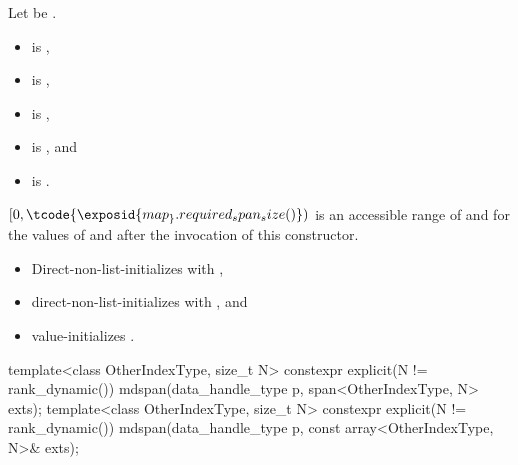 \begin{itemdescr}
\pnum
Let  be .

\pnum
\constraints
\begin{itemize}
\item
{} is ,
\item
{} is ,
\item
{} is ,
\item
{} is , and
\item
{} is .
\end{itemize}

\pnum
\expects
$[0, \tcode{\exposid{map_}.required_span_size()})$ is
an accessible range of  and 
for the values of  and 
after the invocation of this constructor.

\pnum
\effects
\begin{itemize}
\item
Direct-non-list-initializes  with ,
\item
direct-non-list-initializes  with
, and
\item
value-initializes .
\end{itemize}
\end{itemdescr}

%
\begin{itemdecl}
template<class OtherIndexType, size_t N>
  constexpr explicit(N != rank_dynamic())
    mdspan(data_handle_type p, span<OtherIndexType, N> exts);
template<class OtherIndexType, size_t N>
  constexpr explicit(N != rank_dynamic())
    mdspan(data_handle_type p, const array<OtherIndexType, N>& exts);
\end{itemdecl}

